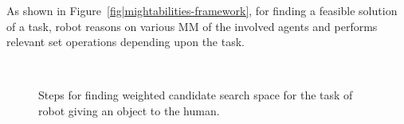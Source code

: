 \documentclass{svmult}
\begin{document}
As shown in Figure~\ref{fig|mightabilities-framework}, for
finding a feasible solution of a task, robot reasons on various MM of
the involved agents and performs relevant set operations depending upon
the task.  

\begin{figure}[ht!]
   \begin{center}
       \\ %
	\end{center}

   \caption{
	Steps for finding weighted candidate search space for the task of robot
	giving an object to the human.}
		
   \label{fig|mightabilities-steps}
\end{figure}
\end{document}

